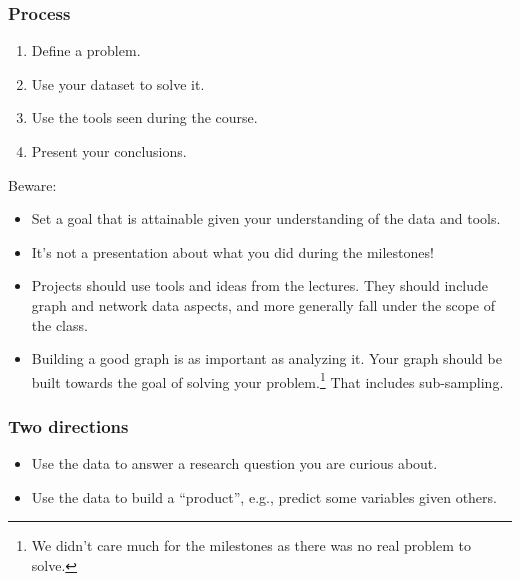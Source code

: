 \documentclass[aspectratio=169]{beamer}
\begin{document}

\begin{frame}
	\frametitle{Process}
	\begin{enumerate}
		\item Define a problem.
		\item Use your dataset to solve it.
		\item Use the tools seen during the course.
		\item Present your conclusions.
	\end{enumerate}
	\vfill
	Beware:
	\begin{itemize}
		\item Set a goal that is attainable given your understanding of the data and tools.
		\item It's not a presentation about what you did during the milestones!
		\item Projects should use tools and ideas from the lectures. They should include graph and network data aspects, and more generally fall under the scope of the class.
		\item Building a good graph is as important as analyzing it. Your graph should be built towards the goal of solving your problem.\footnote{We didn't care much for the milestones as there was no real problem to solve.} That includes sub-sampling.
	\end{itemize}
\end{frame}


\begin{frame}
	\frametitle{Two directions}
	\begin{itemize}
		\item Use the data to answer a research question you are curious about.
		\vfill
		\item Use the data to build a ``product'', e.g., predict some variables given others.
	\end{itemize}
\end{frame}

\end{document}

